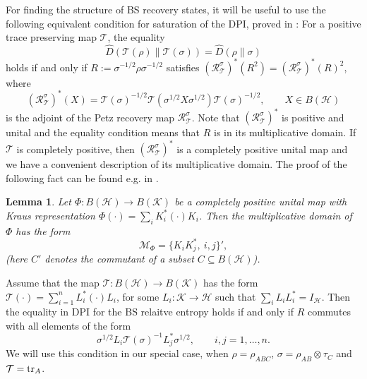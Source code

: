 \documentclass[11pt]{article}
\theoremstyle{newdefinition}
\theoremstyle{newplain}
\newtheorem{lemma}[definition]{Lemma}
\theoremstyle{myplain}
\DeclareMathOperator{\1}{\mathds{1}}
\begin{document}
{\color{magenta} 

For finding the structure of BS recovery states, it will be useful to use the following equivalent  condition for
saturation of the DPI, proved in  \cite[Thm. 3.34(h)]{HiaiMosonyi-f-divergences-2017}: For a positive
trace preserving map $\mathcal {T}$, the equality
\[
\hat D(\mathcal {T}(\rho)\|\mathcal {T}(\sigma))=\hat D(\rho\|\sigma)
\]
holds if and only if $R:=\sigma^{-1/2}\rho\sigma^{-1/2}$ satisfies
$(\mathcal{R}_{\mathcal {T}}^\sigma)^*(R^2)=(\mathcal {R}_{\mathcal {T}}^\sigma)^*(R)^2$, where
\[
(\mathcal{R}_{\mathcal {T}}^\sigma)^*(X)=\mathcal {T}(\sigma)^{-1/2}\mathcal
{T}(\sigma^{1/2}X\sigma^{1/2})\mathcal {T}(\sigma)^{-1/2},\qquad
X\in B(\mathcal {H})
\]
is the adjoint of the Petz recovery map $\mathcal {R}_{\mathcal T}^\sigma$.  Note that
$(\mathcal {R}_{\mathcal T}^\sigma)^*$ is  positive
and unital and the equality condition means that $R$ is in its multiplicative domain. If
$\mathcal {T}$ is completely positive, then $(\mathcal {R}_{\mathcal T}^\sigma)^*$ is a
completely positive unital map and we have a convenient description of its multiplicative
domain. The proof of the following fact can be found e.g. in \cite[Proposition 2]{carbone2020}.

\begin{lemma}\label{lemma:multiplicative} Let $\Phi:B(\mathcal {H})\to B(\mathcal {K})$ be a completely positive unital map with Kraus
representation $\Phi(\cdot)=\sum_i K_i^* (\cdot) K_i$. Then the multiplicative domain of
$\Phi$ has the form
\[
\mathcal {M}_\Phi=\{K_iK_j^*,\ i,j\}',
\]
(here $C'$ denotes the commutant of a subset $C\subseteq B(\mathcal {H})$).
\end{lemma}

Assume that the map $\mathcal {T}: B(\mathcal {H})\to B(\mathcal {K})$ has the form
$\mathcal {T}(\cdot)=\sum_{i=1}^n L_i^*(\cdot)L_i$, for some $L_i:\mathcal {K}\to \mathcal
{H}$ such that
$\sum_iL_iL_i^*=I_{\mathcal {H}}$. Then the equality in DPI for the BS relaitve entropy holds if and only if $R$ commutes
with all elements of the form 
\[
\sigma^{1/2}L_i\mathcal {T}(\sigma)^{-1}L_j^*\sigma^{1/2},\qquad i,j=1,\dots,n.
\]
We will use this condition in our special case, when $\rho=\rho_{ABC}$, $\sigma=\rho_{AB}\otimes
\tau_C$ and $\mathcal {T}=\tr_A$.





}
\end{document}
